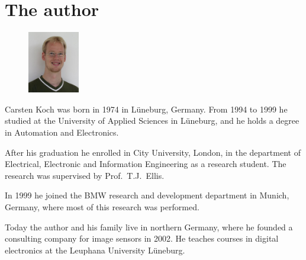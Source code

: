 \chapter*{The author}
%
\label{sec:TheAuthor}%
%
\begin{figure}[h]
\begin{flushright}
	\includegraphics[width =0.2\textwidth]{img/koch}
\end{flushright}
\end{figure}
%
%
Carsten Koch was born in 1974 in L\"{u}neburg,
Germany. From 1994 to 1999 he studied at the University of Applied
Sciences in L\"{u}neburg, and he holds a degree in Automation and
Electronics.

After his graduation he enrolled in City University, London, in
the department of Electrical, Electronic and Information
Engineering as a research student. The research was supervised by
Prof.~T.J.~Ellis.%

In 1999 he joined the BMW research and development department in
Munich, Germany, where most of this research was performed.

Today the author and his family live in northern Germany, where he
founded a consulting company for image sensors in 2002. He teaches
courses in digital electronics at the Leuphana University L\"{u}neburg.


